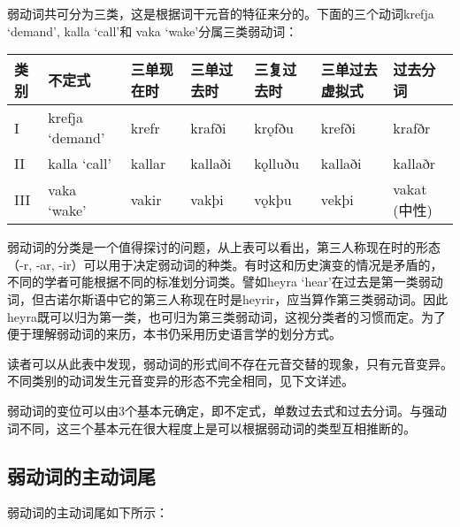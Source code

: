 弱动词共可分为三类，这是根据词干元音的特征来分的。下面的三个动词krefja
`demand‌', kalla `call‌'和 vaka `wake‌'分属三类弱动词：

\begin{longtable}{lllllll}
  \toprule
  类别 & 不定式          & 三单现在时 & 三单过去时 & 三复过去时 & 三单过去虚拟式 & 过去分词     \\
  \midrule
  \endhead
  \bottomrule
  \endfoot
  I    & krefja `demand‌' & krefr      & krafði     & krǫfðu     & krefði         & krafðr       \\
  II   & kalla `call‌'    & kallar     & kallaði    & kǫlluðu    & kallaði        & kallaðr      \\
  III  & vaka `wake‌'     & vakir      & vakþi      & vǫkþu      & vekþi          & vakat (中性) \\
\end{longtable}

弱动词的分类是一个值得探讨的问题，从上表可以看出，第三人称现在时的形态（-r,
-ar,
-ir）可以用于决定弱动词的种类。有时这和历史演变的情况是矛盾的，不同的学者可能根据不同的标准划分词类。譬如heyra
`hear‌'在过去是第一类弱动词，但古诺尔斯语中它的第三人称现在时是heyrir，应当算作第三类弱动词。因此heyra既可以归为第一类，也可归为第三类弱动词，这视分类者的习惯而定。为了便于理解弱动词的来历，本书仍采用历史语言学的划分方式。

读者可以从此表中发现，弱动词的形式间不存在元音交替的现象，只有元音变异。不同类别的动词发生元音变异的形态不完全相同，见下文详述。

弱动词的变位可以由3个基本元确定，即不定式，单数过去式和过去分词。与强动词不同，这三个基本元在很大程度上是可以根据弱动词的类型互相推断的。

\subsection{弱动词的主动词尾}\label{弱动词的主动词尾}

弱动词的主动词尾如下所示：

